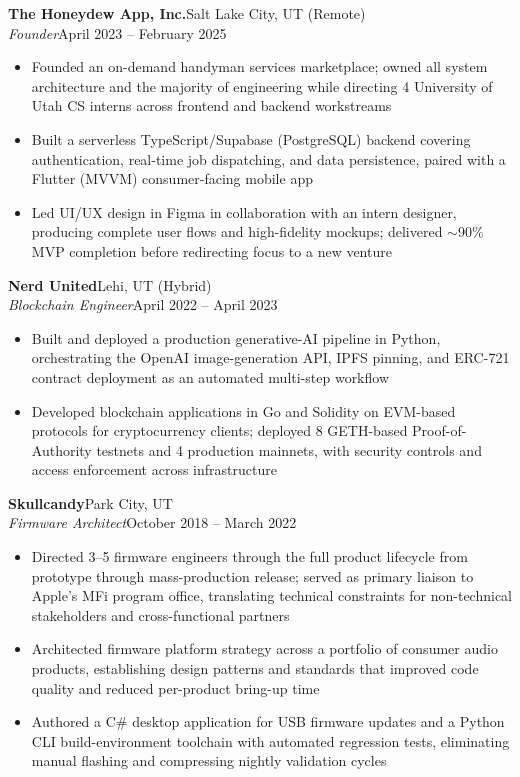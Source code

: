 \documentclass[10.5pt, letterpaper]{article}
\newcommand{\jobentry}[4]{%
  \noindent
  \textbf{\color{accent}#1}\hfill\textcolor{muted}{\small #2}\\
  \textit{#3}\hfill\textcolor{muted}{\small #4}%
}
\begin{document}
\jobentry{The Honeydew App, Inc.}{Salt Lake City, UT (Remote)}{Founder}{April 2023 -- February 2025}
\begin{itemize}
  \item Founded an on-demand handyman services marketplace; owned all system
        architecture and the majority of engineering while directing 4 University
        of Utah CS interns across frontend and backend workstreams
  \item Built a serverless TypeScript/Supabase (PostgreSQL) backend covering
        authentication, real-time job dispatching, and data persistence, paired
        with a Flutter (MVVM) consumer-facing mobile app
  \item Led UI/UX design in Figma in collaboration with an intern designer,
        producing complete user flows and high-fidelity mockups; delivered
        $\sim$90\% MVP completion before redirecting focus to a new venture
\end{itemize}

\vspace{5pt}

\jobentry{Nerd United}{Lehi, UT (Hybrid)}{Blockchain Engineer}{April 2022 -- April 2023}
\begin{itemize}
  \item Built and deployed a production generative-AI pipeline in Python, orchestrating
        the OpenAI image-generation API, IPFS pinning, and ERC-721 contract deployment
        as an automated multi-step workflow
  \item Developed blockchain applications in Go and Solidity on EVM-based protocols for
        cryptocurrency clients; deployed 8 GETH-based Proof-of-Authority testnets and 4
        production mainnets, with security controls and access enforcement across
        infrastructure
\end{itemize}

\vspace{5pt}

\jobentry{Skullcandy}{Park City, UT}{Firmware Architect}{October 2018 -- March 2022}
\begin{itemize}
  \item Directed 3--5 firmware engineers through the full product lifecycle from
        prototype through mass-production release; served as primary liaison to
        Apple's MFi program office, translating technical constraints for
        non-technical stakeholders and cross-functional partners
  \item Architected firmware platform strategy across a portfolio of consumer audio
        products, establishing design patterns and standards that improved code quality
        and reduced per-product bring-up time
  \item Authored a C\# desktop application for USB firmware updates and a Python
        CLI build-environment toolchain with automated regression tests, eliminating
        manual flashing and compressing nightly validation cycles
\end{itemize}
\end{document}
